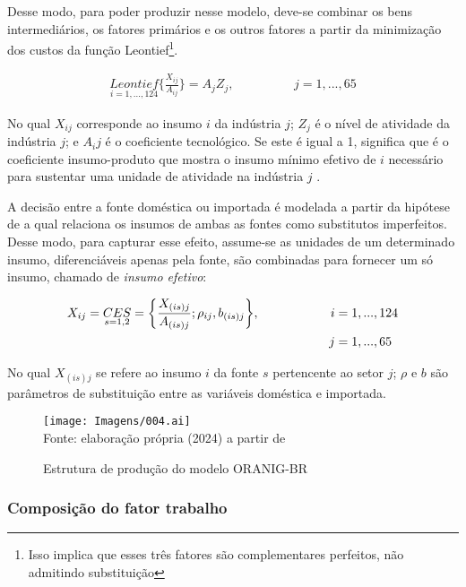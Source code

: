 Desse modo, para poder produzir nesse modelo, deve-se combinar os bens intermediários, os fatores primários e os outros fatores a partir da minimização dos custos da função Leontief\footnote{Isso implica que esses três fatores são complementares perfeitos, não admitindo substituição}.

\begin{align}
	\underset{i = 1, ... , 124}{Leontief} \biggl\{ \frac{X_{ij}}{A_{ij}} \biggr\} = A_jZ_j, \hspace{2cm} j = 1, ... , 65
\end{align}

No qual $X_{ij}$ corresponde ao insumo $i$ da indústria $j$; $Z_j$ é o nível de atividade da indústria $j$; e $A_ij$ é o coeficiente tecnológico. Se este é igual a 1, significa que é o coeficiente insumo-produto que mostra o insumo mínimo efetivo de $i$ necessário para sustentar uma unidade de atividade na indústria $j$ \cite{dixit80}.

A decisão entre a fonte doméstica ou importada é modelada a partir da hipótese de \textcite{armington69} a qual relaciona os insumos de ambas as fontes como substitutos imperfeitos. Desse modo, para capturar esse efeito, assume-se as unidades de um determinado insumo, diferenciáveis apenas pela fonte, são combinadas para fornecer um só insumo, chamado de \textit{insumo efetivo}:

\begin{align}
	X_{ij} = \underset{s = 1, 2}{CES} = \biggl\{ \frac{X_{(is)j}}{A_{(is)j}}; \rho_{ij}, b_{(is)j} \biggl\}, \hspace{2cm} i & = 1, ... , 124 \\ j & = 1, ... , 65 \notag
\end{align}

No qual $X_{(is)j}$ se refere ao insumo $i$ da fonte $s$ pertencente ao setor $j$; $\rho$ e $b$ são parâmetros de substituição entre as variáveis doméstica e importada. 

\begin{landscape}
	\begin{figure}
		\centering
		\caption{Estrutura de produção do modelo ORANIG-BR} \label{fig:estrutura_producao}
		\texttt{[image: Imagens/004.ai]}
		\footnotesize \\
		Fonte: elaboração própria (2024) a partir de \textcite{horridge00}
	\end{figure}
\end{landscape}

\subsubsection{Composição do fator trabalho} \label{}

